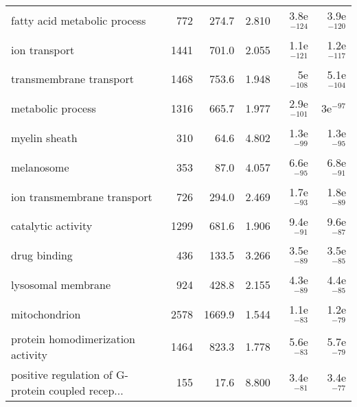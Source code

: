 \begin{longtable}{lrrrrr}
                      fatty acid metabolic process &                     772 &                   274.7 &      2.810 &        3.8e$^{-124}$ &        3.9e$^{-120}$ \\
                                     ion transport &                    1441 &                   701.0 &      2.055 &        1.1e$^{-121}$ &        1.2e$^{-117}$ \\
                           transmembrane transport &                    1468 &                   753.6 &      1.948 &          5e$^{-108}$ &        5.1e$^{-104}$ \\
                                 metabolic process &                    1316 &                   665.7 &      1.977 &        2.9e$^{-101}$ &           3e$^{-97}$ \\
                                     myelin sheath &                     310 &                    64.6 &      4.802 &         1.3e$^{-99}$ &         1.3e$^{-95}$ \\
                                        melanosome &                     353 &                    87.0 &      4.057 &         6.6e$^{-95}$ &         6.8e$^{-91}$ \\
                       ion transmembrane transport &                     726 &                   294.0 &      2.469 &         1.7e$^{-93}$ &         1.8e$^{-89}$ \\
                                catalytic activity &                    1299 &                   681.6 &      1.906 &         9.4e$^{-91}$ &         9.6e$^{-87}$ \\
                                      drug binding &                     436 &                   133.5 &      3.266 &         3.5e$^{-89}$ &         3.5e$^{-85}$ \\
                                lysosomal membrane &                     924 &                   428.8 &      2.155 &         4.3e$^{-89}$ &         4.4e$^{-85}$ \\
                                     mitochondrion &                    2578 &                  1669.9 &      1.544 &         1.1e$^{-83}$ &         1.2e$^{-79}$ \\
                 protein homodimerization activity &                    1464 &                   823.3 &      1.778 &         5.6e$^{-83}$ &         5.7e$^{-79}$ \\
 positive regulation of G-protein coupled recep... &                     155 &                    17.6 &      8.800 &         3.4e$^{-81}$ &         3.4e$^{-77}$ \\

\end{longtable}
